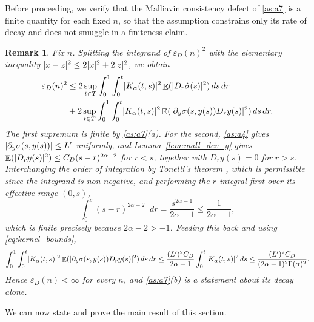 \documentclass[11pt, a4paper]{article}
\theoremstyle{theoremstyle}
\theoremstyle{definitionstyle}
\newtheorem{remark}[theorem]{Remark}
\newcommand{\dd}{\mathop{}\!d}
\DeclareMathOperator{\EE}{\mathbb E}
\DeclarePairedDelimiter{\abs}{\lvert}{\rvert}
\begin{document}
Before proceeding, we verify that the Malliavin consistency defect of \ref{as:a7} is a finite quantity for each fixed $n$, so that the assumption constrains only its rate of decay and does not smuggle in a finiteness claim.
\begin{remark}\label{rem:epsD_finite}
    Fix $n$. Splitting the integrand of $\varepsilon_D(n)^2$ with the elementary inequality $\abs{x - z}^2 \leq 2\abs{x}^2 + 2\abs{z}^2$, we obtain
    \begin{equation}
    \begin{aligned}
        \varepsilon_D(n)^2 &\leq 2\sup_{t \in T}\int_0^1 \int_0^t \abs{K_\alpha(t, s)}^2 \EE (\abs{D_r\hat\sigma(s)}^2)\dd{s}\dd{r} \\
        &+ 2\sup_{t \in T}\int_0^1 \int_0^t \abs{K_\alpha(t, s)}^2\EE (\abs{\partial_y \sigma(s, y(s))D_ry(s)}^2)\dd{s}\dd{r}.
    \end{aligned}
    \end{equation}
    The first supremum is finite by \ref{as:a7}(a). For the second, \ref{as:a4} gives $\abs{\partial_y\sigma(s, y(s))} \leq L'$ uniformly, and Lemma~\ref{lem:mall_dev_y} gives $\EE(\abs{D_ry(s)}^2) \leq C_D(s - r)^{2\alpha - 2}$ for $r < s$, together with $D_ry(s) = 0$ for $r > s$. Interchanging the order of integration by Tonelli's theorem \cite{folland1999real}, which is permissible since the integrand is non-negative, and performing the $r$ integral first over its effective range $(0, s)$,
    \begin{equation}
        \int_0^s (s - r)^{2\alpha - 2}\dd{r} = \frac{s^{2\alpha - 1}}{2\alpha - 1} \leq \frac 1{2\alpha - 1},
    \end{equation}
    which is finite precisely because $2\alpha - 2 > -1$. Feeding this back and using \eqref{eq:kernel_bounds},
    \begin{equation}
        \int_0^1 \int_0^t \abs{K_\alpha(t, s)}^2 \EE (\abs{\partial_y\sigma(s, y(s))D_ry(s)}^2)\dd{s}\dd{r} \leq \frac{(L')^2C_D}{2\alpha - 1}\int_0^t \abs{K_\alpha(t, s)}^2\dd{s} \leq \frac{(L')^2C_D}{(2\alpha-1)^2\Gamma(\alpha)^2}.
    \end{equation}
    Hence $\varepsilon_D(n) < \infty$ for every $n$, and \ref{as:a7}(b) is a statement about its decay alone.
\end{remark}

We can now state and prove the main result of this section.
\end{document}
